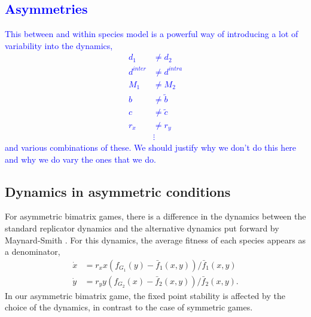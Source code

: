 \documentclass[times,onecolumn]{scrartcl}
\newcommand{\cha}[1]{\textcolor{blue}{#1}}
\begin{document}
\cha{\section{Asymmetries}}

\cha{This between and within species model is a powerful way of introducing a lot of variability into the dynamics,
\begin{align}
	d_1 &\neq d_2 \\
	d^{inter} &\neq d^{intra} \\
	M_1 &\neq M_2 \\
	b &\neq \tilde{b} \\
	c &\neq \tilde{c} \\
	r_x &\neq r_y \\
	&\vdots
\end{align}
and various combinations of these. We should justify why we don't do this here and why we do vary the ones that we do.}


\subsection{Dynamics in asymmetric conditions}


For asymmetric bimatrix games, there is a difference in the dynamics between the standard replicator dynamics and the 
alternative dynamics put forward by Maynard-Smith \cite{maynard-smith:1982to}.
For this dynamics, the average fitness of each species appears as a denominator,
\begin{align}
\dot{x} &= r_x x \left(f_{G_1}(y) -  \bar{f}_1(x,y) \right)/\bar{f}_1(x,y) \nonumber \\
\dot{y} &= r_y y \left(f_{G_2}(x) -  \bar{f}_2(x,y) \right)/\bar{f}_2(x,y).
\label{eq:repeqs}
\end{align}
In our asymmetric bimatrix game, the fixed point stability is affected by the choice of the dynamics, in contrast to the case of symmetric games. 
\end{document}

